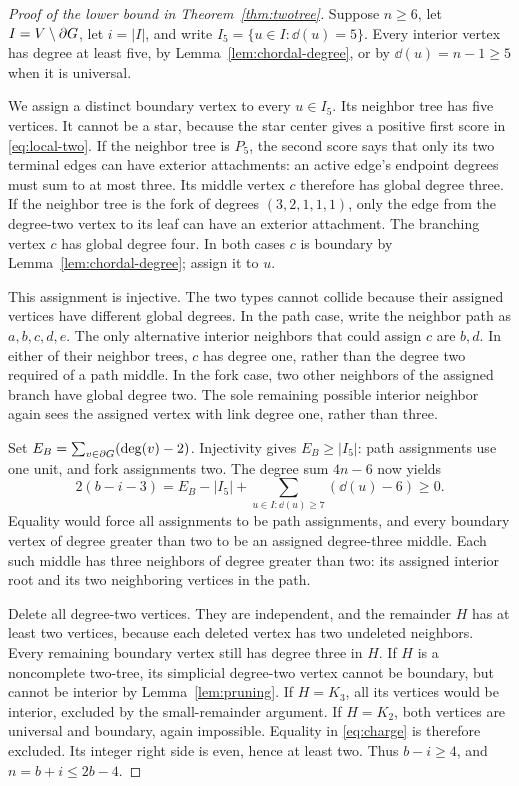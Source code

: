 \begin{proof}[Proof of the lower bound in Theorem~\ref{thm:twotree}]
Suppose $n\ge6$, let $I=V\setminus\partial G$, let $i=|I|$, and write
$I_5=\{u\in I:\dd(u)=5\}$. Every interior vertex has degree at least
five, by Lemma~\ref{lem:chordal-degree}, or by $\dd(u)=n-1\ge5$
when it is universal.

We assign a distinct boundary vertex to every $u\in I_5$. Its neighbor
tree has five vertices. It cannot be a star, because the star center gives
a positive first score in \eqref{eq:local-two}. If the neighbor tree is
$P_5$, the second score says that only its two terminal edges can have
exterior attachments: an active edge's endpoint degrees must sum to at
most three. Its middle vertex $c$ therefore has global degree three.
If the neighbor tree is the fork of degrees $(3,2,1,1,1)$, only the edge
from the degree-two vertex to its leaf can have an exterior attachment.
The branching vertex $c$ has global degree four. In both cases $c$ is
boundary by Lemma~\ref{lem:chordal-degree}; assign it to $u$.

This assignment is injective. The two types cannot collide because their
assigned vertices have different global degrees. In the path case, write
the neighbor path as $a,b,c,d,e$. The only alternative interior neighbors
that could assign $c$ are $b,d$. In either of their neighbor trees, $c$
has degree one, rather than the degree two required of a path middle.
In the fork case, two other neighbors of the assigned branch have global
degree two. The sole remaining possible interior neighbor again sees
the assigned vertex with link degree one, rather than three.

Set $E_B=\sum_{v\in\partial G}(\operatorname{deg}(v)-2)$. Injectivity gives
$E_B\ge|I_5|$: path assignments use one unit, and fork assignments two.
The degree sum $4n-6$ now yields
\begin{equation}\label{eq:charge}
2(b-i-3)=E_B-|I_5|+
 \sum_{u\in I:\dd(u)\ge7}(\dd(u)-6)\ge0.
\end{equation}
Equality would force all assignments to be path assignments, and every
boundary vertex of degree greater than two to be an assigned degree-three
middle. Each such middle has three neighbors of degree greater than two:
its assigned interior root and its two neighboring vertices in the path.

Delete all degree-two vertices. They are independent, and the remainder
$H$ has at least two vertices, because each deleted vertex has two
undeleted neighbors. Every remaining boundary vertex still has degree
three in $H$. If $H$ is a noncomplete two-tree, its simplicial degree-two
vertex cannot be boundary, but cannot be interior by Lemma~\ref{lem:pruning}.
If $H=K_3$, all its vertices would be interior, excluded by the small-remainder
argument. If $H=K_2$, both vertices are universal and boundary, again
impossible. Equality in \eqref{eq:charge} is therefore excluded.
Its integer right side is even, hence at least two. Thus $b-i\ge4$,
and $n=b+i\le2b-4$.
\end{proof}


